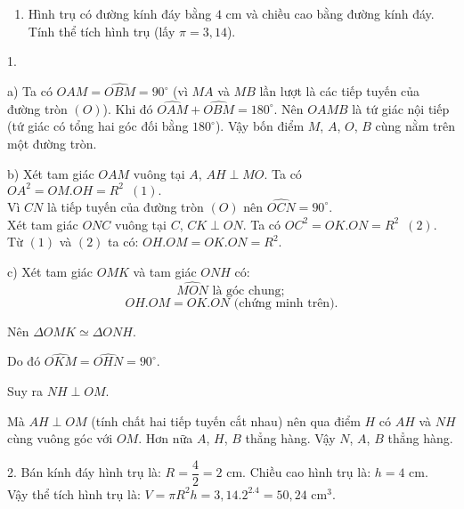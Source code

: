 \begin{ex}
\begin{enumerate}
\item Hình trụ có đường kính đáy bằng $4$ cm và chiều cao bằng đường kính đáy. Tính thể tích hình trụ (lấy $\pi=3,14$).
\end{enumerate}
\loigiai
{
\immini
{\par 1.
\par a) Ta có $\widehat{OAM}=\widehat{OBM}=90^\circ$ (vì $MA$ và $MB$ lần lượt là các tiếp tuyến của đường tròn $(O)$). Khi đó $\widehat{OAM}+\widehat{OBM}=180^\circ$. Nên $OAMB$ là tứ giác nội tiếp (tứ giác có tổng hai góc đối bằng $180^\circ$). Vậy bốn điểm $M$, $A$, $O$, $B$ cùng nằm trên một đường tròn.
\par b) Xét tam giác $OAM$ vuông tại $A$, $AH \perp MO$. Ta có $OA^2=OM.OH=R^2 \hspace{6pt} (1).$\\
Vì $CN$ là tiếp tuyến của đường tròn $(O)$ nên $\widehat{OCN}=90^\circ$.\\
Xét tam giác $ONC$ vuông tại $C$, $CK \perp ON$. Ta có
$OC^2=OK.ON=R^2 \hspace{6pt} (2).$\\
Từ $(1)$ và $(2)$ ta có: $OH.OM=OK.ON=R^2$.
\par c) Xét tam giác $OMK$ và tam giác $ONH$ có: $$\widehat{MON} \text{ là góc chung};$$ $$OH.OM=OK.ON \text{ (chứng minh trên)}.$$
\par Nên $\Delta OMK \simeq \Delta ONH$.
\par Do đó $\widehat{OKM}=\widehat{OHN}=90^\circ$.
\par Suy ra $NH \perp OM$.
\par Mà $AH \perp OM$ (tính chất hai tiếp tuyến cắt nhau) nên qua điểm $H$ có $AH$ và $NH$ cùng vuông góc với $OM$. Hơn nữa $A$, $H$, $B$ thẳng hàng. Vậy $N$, $A$, $B$ thẳng hàng.
}
{
}
2. Bán kính đáy hình trụ là: $R=\dfrac{4}{2}=2$ cm. Chiều cao hình trụ là: $h=4$ cm.\\
Vậy thể tích hình trụ là: $V=\pi R^2h=3,14.2^2.4=50,24$ cm$^3$.}
\end{ex}

